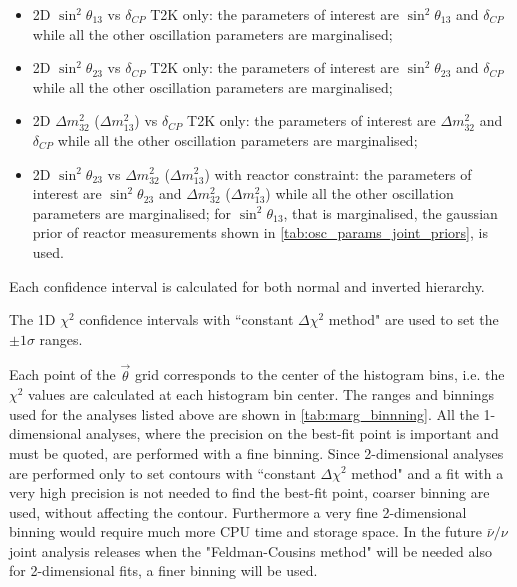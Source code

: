 \begin{itemize}
\item 
2D $\sin^2 \theta_{13}$ vs $\delta_{CP}$ T2K only: 
the parameters of interest are $\sin^2 \theta_{13}$ and $\delta_{CP}$ while
all the other oscillation parameters are marginalised;

\item 
2D $\sin^2 \theta_{23}$ vs $\delta_{CP}$ T2K only: 
the parameters of interest are $\sin^2 \theta_{23}$ and $\delta_{CP}$ while
all the other oscillation parameters are marginalised;

\item 
2D $\Delta m^2_{32}$ ($\Delta m^2_{13}$) vs $\delta_{CP}$ T2K only: 
the parameters of interest are $\Delta m^2_{32}$ and $\delta_{CP}$ while
all the other oscillation parameters are marginalised;

\item 
2D $\sin^2 \theta_{23}$ vs $\Delta m^2_{32}$ ($\Delta m^2_{13}$) with reactor constraint: 
the parameters of interest are $\sin^2 \theta_{23}$ and $\Delta m^2_{32}$ ($\Delta m^2_{13}$) 
while all the other oscillation parameters are marginalised;
for $\sin^2 \theta_{13}$, that is marginalised,
the gaussian prior of reactor measurements shown in \cref{tab:osc_params_joint_priors}, is used. 

\end{itemize}

Each confidence interval is calculated for both normal and inverted hierarchy.

The 1D $\chi^2$ confidence intervals with ``constant $\Delta \chi^2$ method" are used to set the $\pm 1 \sigma$ ranges.

Each point of the $\vec{\theta}$ grid corresponds to the center of the histogram bins,
i.e. the $\chi^2$ values are calculated at each histogram bin center. 
The ranges and binnings used for the analyses listed above are shown in \cref{tab:marg_binnning}.
All the 1-dimensional analyses, where the precision on the best-fit point is important 
and must be quoted, are performed with a fine binning.
Since 2-dimensional analyses are performed only to set contours with ``constant $\Delta \chi^2$ method"
and a fit with a very high precision is not needed to find the best-fit point, 
coarser binning are used, without affecting the contour.
Furthermore a very fine 2-dimensional binning would require much more CPU time and storage space.
In the future $\bar{\nu}/\nu$ joint analysis releases when the "Feldman-Cousins method" will be needed 
also for 2-dimensional fits, a finer binning will be used.

